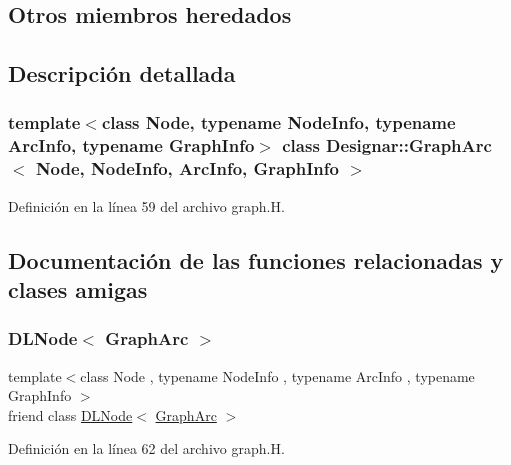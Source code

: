\subsection*{Otros miembros heredados}


\subsection{Descripción detallada}
\subsubsection*{template$<$class Node, typename Node\+Info, typename Arc\+Info, typename Graph\+Info$>$\newline
class Designar\+::\+Graph\+Arc$<$ Node, Node\+Info, Arc\+Info, Graph\+Info $>$}



Definición en la línea 59 del archivo graph.\+H.



\subsection{Documentación de las funciones relacionadas y clases amigas}
\mbox{\label{class_designar_1_1_graph_arc_a94936ca2e45f109cf3805a93858fbc75}} 
\subsubsection{\texorpdfstring{D\+L\+Node$<$ Graph\+Arc $>$}{DLNode< GraphArc >}}
{\footnotesize\ttfamily template$<$class Node , typename Node\+Info , typename Arc\+Info , typename Graph\+Info $>$ \\
friend class \hyperlink{class_designar_1_1_d_l_node}{D\+L\+Node}$<$ \hyperlink{class_designar_1_1_graph_arc}{Graph\+Arc} $>$\hspace{0.3cm}{\ttfamily [friend]}}



Definición en la línea 62 del archivo graph.\+H.

\mbox{\label{class_designar_1_1_graph_arc_a0a9834688687d864501bbb9c85b0d32c}} 
